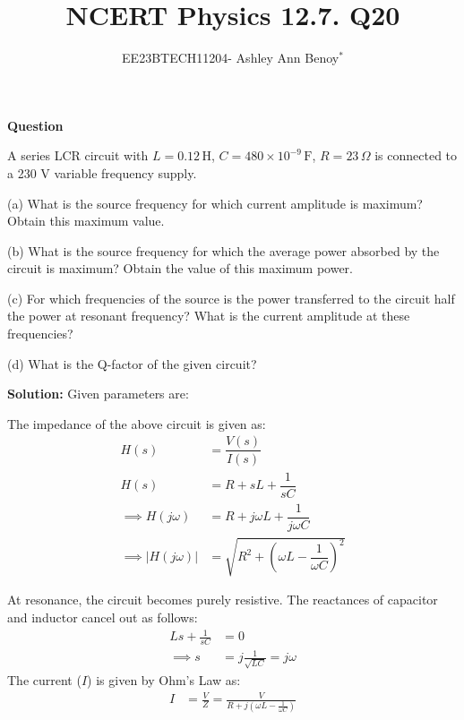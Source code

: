 \documentclass[journal,12pt,twocolumn]{IEEEtran}
\theoremstyle{remark}
\begin{document}

\vspace{3cm}

\title{NCERT Physics 12.7. Q20}
\author{EE23BTECH11204- Ashley Ann Benoy$^{*}$%
}
\maketitle
\newpage
\bigskip

\renewcommand{\thefigure}{\theenumi}
\renewcommand{\thetable}{\theenumi}



\textbf{Question}

A series LCR circuit with 
\(L = 0.12 \, \text{H}\),
\(C = 480 \times 10^{-9} \, \text{F}\), 
\(R=23 \, \Omega\)
is connected to a 230 V variable frequency supply.

(a) What is the source frequency for which current amplitude is maximum? Obtain this maximum value.

(b) What is the source frequency for which the average power absorbed by the circuit is maximum? Obtain the value of this maximum power.

(c) For which frequencies of the source is the power transferred to the circuit half the power at resonant frequency? What is the current amplitude at these frequencies?

(d) What is the Q-factor of the given circuit?

\textbf{Solution:}
Given parameters are:




The impedance of the above circuit is given as:
\begin{align}
  H(s) &= \dfrac{V(s)}{I(s)}\\
     H(s) &= R + sL + \dfrac{1}{sC}\\
     \implies H(j\omega) &= R + j\omega L + \dfrac{1}{j\omega C}\\
     \implies \lvert H(j\omega) \rvert &= \sqrt{R^2 + \left(\omega L - \dfrac{1}{\omega C}\right)^2}
\end{align}

 At resonance, the circuit becomes purely resistive. The reactances of capacitor and inductor cancel out as follows:
\begin{align}
    Ls + \frac{1}{sC} &= 0 \\
    \implies s &= j\frac{1}{\sqrt{LC}} = j\omega
\end{align}
The current (\(I\)) is given by Ohm's Law as:
\begin{align}
    I &= \frac{V}{Z} = \frac{V}{R + j(\omega L - \frac{1}{\omega C})}
\end{align}
\end{document}
